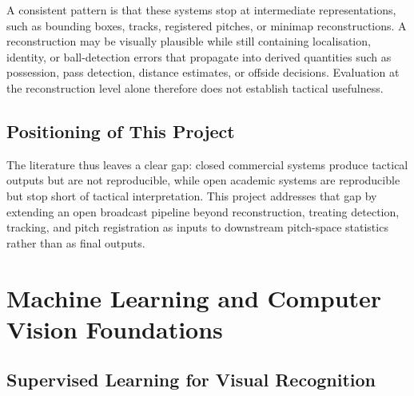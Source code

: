 A consistent pattern is that these systems stop at 
intermediate representations, such as bounding boxes, tracks, 
registered pitches, or minimap reconstructions. A 
reconstruction may be visually plausible while still 
containing localisation, identity, or ball-detection errors 
that propagate into derived quantities such as possession, 
pass detection, distance estimates, or offside decisions. 
Evaluation at the reconstruction level alone therefore does 
not establish tactical usefulness.

\subsection{Positioning of This Project}

The literature thus leaves a clear gap: closed commercial 
systems produce tactical outputs but are not reproducible, 
while open academic systems are reproducible but stop short 
of tactical interpretation. This project addresses that gap 
by extending an open broadcast pipeline beyond reconstruction, 
treating detection, tracking, and pitch registration as 
inputs to downstream pitch-space statistics rather than as 
final outputs.

\section{Machine Learning and Computer Vision Foundations}
\label{sec:ml-cv-foundations}

\subsection{Supervised Learning for Visual Recognition}
\label{sec:supervised-learning}

